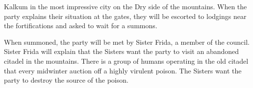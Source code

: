 Kalkum in the most impressive city on the Dry side of the mountains.
When the party explains their situation at the gates, they will be escorted to lodgings near the fortifications and asked to wait for a summons.

When summoned, the party will be met by Sister Frida, a member of the council.
Sister Frida will explain that the Sisters want the party to visit an abandoned citadel in the mountains.
There is a group of humans operating in the old citadel that every midwinter auction off a highly virulent poison.
The Sisters want the party to destroy the source of the poison.
